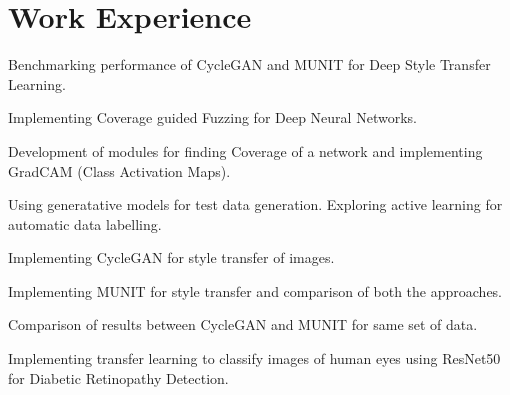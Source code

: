 \documentclass[a4paper]{deedy-resume-openfont}
\begin{document}
\begin{minipage}[t]{0.66\textwidth} 




\section{Work Experience}
\vspace{\topsep} %
\begin{tightemize}
\item Benchmarking performance of CycleGAN and MUNIT for Deep Style Transfer Learning.
\item Implementing Coverage guided Fuzzing for Deep Neural Networks.
\item Development of modules for finding Coverage of a network and implementing GradCAM (Class Activation Maps).
\end{tightemize}

\begin{tightemize}
\item Using generatative models for test data generation. Exploring active learning for automatic data labelling.
\item Implementing CycleGAN for style transfer of images. 
\item Implementing MUNIT for style transfer and comparison of both the approaches.
\item Comparison of results between CycleGAN and MUNIT for same set of data.
\end{tightemize}

\begin{tightemize}
\item Implementing transfer learning to classify images of human eyes using ResNet50 for Diabetic Retinopathy Detection.
\end{tightemize}



\end{minipage}
\end{document}
